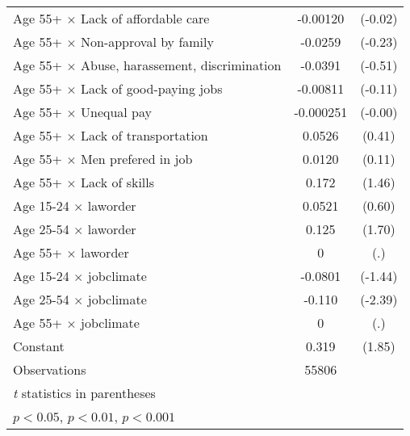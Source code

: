 {\begin{longtable}{l*{1}{cc}}
Age 55+ $\times$ Lack of affordable care&    -0.00120         &     (-0.02)\\
Age 55+ $\times$ Non-approval by family&     -0.0259         &     (-0.23)\\
Age 55+ $\times$ Abuse, harassement, discrimination&     -0.0391         &     (-0.51)\\
Age 55+ $\times$ Lack of good-paying jobs&    -0.00811         &     (-0.11)\\
Age 55+ $\times$ Unequal pay&   -0.000251         &     (-0.00)\\
Age 55+ $\times$ Lack of transportation&      0.0526         &      (0.41)\\
Age 55+ $\times$ Men prefered in job&      0.0120         &      (0.11)\\
Age 55+ $\times$ Lack of skills&       0.172         &      (1.46)\\
Age 15-24 $\times$ laworder&      0.0521         &      (0.60)\\
Age 25-54 $\times$ laworder&       0.125         &      (1.70)\\
Age 55+ $\times$ laworder&           0         &         (.)\\
Age 15-24 $\times$ jobclimate&     -0.0801         &     (-1.44)\\
Age 25-54 $\times$ jobclimate&      -0.110\sym{*}  &     (-2.39)\\
Age 55+ $\times$ jobclimate&           0         &         (.)\\
Constant            &       0.319         &      (1.85)\\
\hline
Observations        &       55806         &            \\
\hline\hline
\multicolumn{3}{l}{\footnotesize \textit{t} statistics in parentheses}\\
\multicolumn{3}{l}{\footnotesize \sym{*} \(p<0.05\), \sym{**} \(p<0.01\), \sym{***} \(p<0.001\)}\\
\end{longtable}
}
